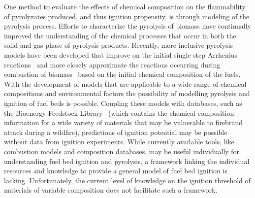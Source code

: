     One method to evaluate the effects of chemical composition on the flammability of pyrolyzates produced, and thus ignition propensity, is through modeling of the pyrolysis process. Efforts to characterize the pyrolysis of biomass have continually improved the understanding of the chemical processes that occur in both the solid and gas phase of pyrolysis products. Recently, more inclusive pyrolysis models have been developed that improve on the initial single step Arrhenius reactions~\cite{DIBLASI199371} and more closely approximate the reactions occurring during combustion of biomass~\cite{Ranzi2008, Debiagi2015, Dhahak2019} based on the initial chemical composition of the fuels. With the development of models that are applicable to a wide range of chemical compositions and environmental factors the possibility of modelling pyrolysis and ignition of fuel beds is possible. Coupling these models with databases, such as the Bioenergy Feedstock Library~\cite{feedstock} (which contains the chemical composition information for a wide variety of materials that may be vulnerable to firebrand attack during a wildfire), predictions of ignition potential may be possible without data from ignition experiments. While currently available tools, like combustion models and composition databases, may be useful individually for understanding fuel bed ignition and pyrolysis, a framework linking the individual resources and knowledge to provide a general model of fuel bed ignition is lacking. Unfortunately, the current level of knowledge on the ignition threshold of materials of variable composition does not facilitate such a framework.
    
